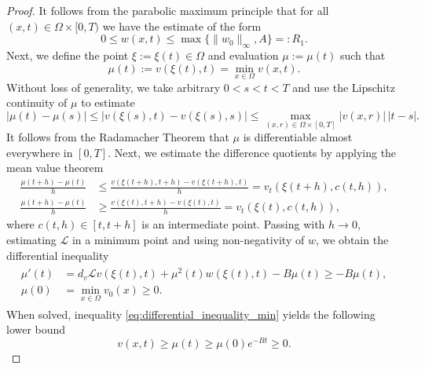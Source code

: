 \documentclass[review,onefignum,onetabnum]{SIAM-styles/siamart171218}
\begin{document}
\begin{proof}
    It follows from the parabolic maximum principle that for all $(x, t) \in \Omega \times [0, T)$ we have the estimate of the form
    \begin{equation}
        \label{EQ:AprioriEstimate_V}
        0 \leq w(x, t) \leq \max\{\|w_0\|_\infty, A\} =: R_1.
    \end{equation}
    Next, we define the point $\xi := \xi(t) \in \Omega$ and evaluation $\mu := \mu(t)$ such that 
    \begin{equation*}
        \mu(t) := v(\xi(t), t) = \min_{x \in \Omega} v(x, t).
    \end{equation*}
    Without loss of generality, we take arbitrary $0 < s < t < T$ and use the 
    Lipschitz continuity of $\mu$ to estimate
    \begin{equation*}
        \left|\mu(t) - \mu(s)\right| \leq \left|v(\xi(s), t) - v(\xi(s), s)\right| \leq \max_{(x, r) \in \Omega \times [0, T]} |v(x, r)|\, |t-s|.
    \end{equation*}
    It follows from the Radamacher Theorem \cite[Theorem 3.2]{EvansGariepy2015} that $\mu$ is differentiable almost everywhere in $[0, T]$. Next, we estimate the difference quotients by applying the mean value theorem
    \begin{align*}
        \frac{\mu(t+h) - \mu(t)}{h} &\leq \frac{v(\xi(t+h), t+h) - v(\xi(t + h), t)}{h} = v_t(\xi(t + h), c(t, h)), \\
        \frac{\mu(t+h) - \mu(t)}{h} &\geq \frac{v(\xi(t), t+h) - v(\xi(t), t)}{h} = v_t(\xi(t), c(t, h)),
    \end{align*}
    where $c(t,h) \in [t, t+h]$ is an intermediate point. Passing with $h \rightarrow 0$, estimating $\mathcal{L}$ in a minimum point and using non-negativity of $w$, we obtain the differential inequality
    \begin{align}
        \label{eq:differential_inequality_min}
        \begin{split}
            \mu'(t) &= d_v \mathcal{L} v(\xi(t), t) + \mu^2(t) w(\xi(t), t) - B \mu(t) \geq - B \mu(t), \\
            \mu(0) &= \min_{x \in \Omega} v_0(x) \geq 0.
        \end{split}
    \end{align}
    When solved, inequality \eqref{eq:differential_inequality_min} yields the following lower bound 
    \begin{equation*}
        v(x,t) \geq \mu(t) \geq \mu(0) e^{-B t} \geq 0.
    \end{equation*}

\end{proof}
\end{document}
